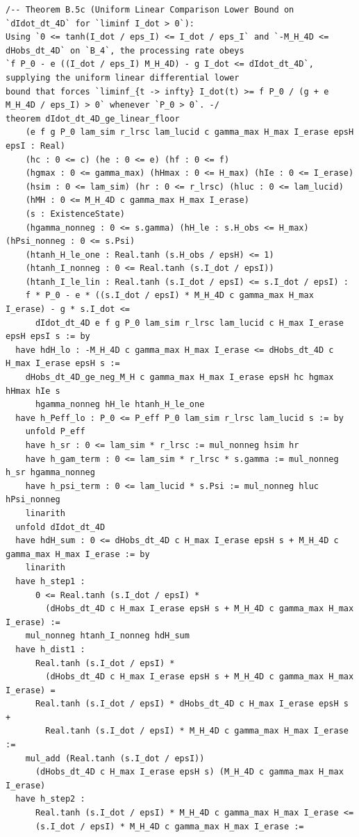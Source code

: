 \documentclass[11pt,a4paper]{article}
\theoremstyle{definition}
\begin{document}
\begin{lstlisting}[language=Lean4]
/-- Theorem B.5c (Uniform Linear Comparison Lower Bound on `dIdot_dt_4D` for `liminf I_dot > 0`):
Using `0 <= tanh(I_dot / eps_I) <= I_dot / eps_I` and `-M_H_4D <= dHobs_dt_4D` on `B_4`, the processing rate obeys
`f P_0 - e ((I_dot / eps_I) M_H_4D) - g I_dot <= dIdot_dt_4D`, supplying the uniform linear differential lower
bound that forces `liminf_{t -> infty} I_dot(t) >= f P_0 / (g + e M_H_4D / eps_I) > 0` whenever `P_0 > 0`. -/
theorem dIdot_dt_4D_ge_linear_floor
    (e f g P_0 lam_sim r_lrsc lam_lucid c gamma_max H_max I_erase epsH epsI : Real)
    (hc : 0 <= c) (he : 0 <= e) (hf : 0 <= f)
    (hgmax : 0 <= gamma_max) (hHmax : 0 <= H_max) (hIe : 0 <= I_erase)
    (hsim : 0 <= lam_sim) (hr : 0 <= r_lrsc) (hluc : 0 <= lam_lucid)
    (hMH : 0 <= M_H_4D c gamma_max H_max I_erase)
    (s : ExistenceState)
    (hgamma_nonneg : 0 <= s.gamma) (hH_le : s.H_obs <= H_max) (hPsi_nonneg : 0 <= s.Psi)
    (htanh_H_le_one : Real.tanh (s.H_obs / epsH) <= 1)
    (htanh_I_nonneg : 0 <= Real.tanh (s.I_dot / epsI))
    (htanh_I_le_lin : Real.tanh (s.I_dot / epsI) <= s.I_dot / epsI) :
    f * P_0 - e * ((s.I_dot / epsI) * M_H_4D c gamma_max H_max I_erase) - g * s.I_dot <=
      dIdot_dt_4D e f g P_0 lam_sim r_lrsc lam_lucid c H_max I_erase epsH epsI s := by
  have hdH_lo : -M_H_4D c gamma_max H_max I_erase <= dHobs_dt_4D c H_max I_erase epsH s :=
    dHobs_dt_4D_ge_neg_M_H c gamma_max H_max I_erase epsH hc hgmax hHmax hIe s
      hgamma_nonneg hH_le htanh_H_le_one
  have h_Peff_lo : P_0 <= P_eff P_0 lam_sim r_lrsc lam_lucid s := by
    unfold P_eff
    have h_sr : 0 <= lam_sim * r_lrsc := mul_nonneg hsim hr
    have h_gam_term : 0 <= lam_sim * r_lrsc * s.gamma := mul_nonneg h_sr hgamma_nonneg
    have h_psi_term : 0 <= lam_lucid * s.Psi := mul_nonneg hluc hPsi_nonneg
    linarith
  unfold dIdot_dt_4D
  have hdH_sum : 0 <= dHobs_dt_4D c H_max I_erase epsH s + M_H_4D c gamma_max H_max I_erase := by
    linarith
  have h_step1 :
      0 <= Real.tanh (s.I_dot / epsI) *
        (dHobs_dt_4D c H_max I_erase epsH s + M_H_4D c gamma_max H_max I_erase) :=
    mul_nonneg htanh_I_nonneg hdH_sum
  have h_dist1 :
      Real.tanh (s.I_dot / epsI) *
        (dHobs_dt_4D c H_max I_erase epsH s + M_H_4D c gamma_max H_max I_erase) =
      Real.tanh (s.I_dot / epsI) * dHobs_dt_4D c H_max I_erase epsH s +
        Real.tanh (s.I_dot / epsI) * M_H_4D c gamma_max H_max I_erase :=
    mul_add (Real.tanh (s.I_dot / epsI))
      (dHobs_dt_4D c H_max I_erase epsH s) (M_H_4D c gamma_max H_max I_erase)
  have h_step2 :
      Real.tanh (s.I_dot / epsI) * M_H_4D c gamma_max H_max I_erase <=
      (s.I_dot / epsI) * M_H_4D c gamma_max H_max I_erase :=

\end{lstlisting}
\end{document}
